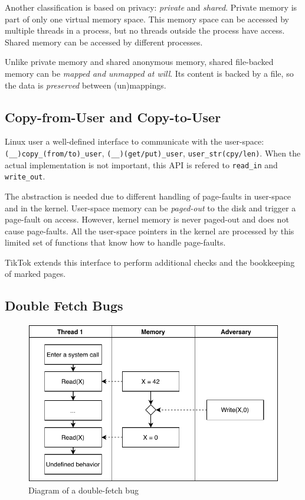 \documentclass[conference]{IEEEtran}
\newcommand{\sysname}{TikTok}
\begin{document}
Another classification is based on privacy: \emph{private} and \emph{shared}. 
Private memory is part of only one virtual memory space. This memory space can 
be accessed by multiple threads in a process, but no threads outside the process
have access. Shared memory can be accessed by different processes.

Unlike private memory and shared anonymous memory, shared file-backed memory can
be \emph{mapped and unmapped at will}. Its content is backed by a file, so the
data is \emph{preserved} between (un)mappings.

\subsection{Copy-from-User and Copy-to-User}
\label{subsec:copy}

Linux user a well-defined interface to communicate with the user-space:
\texttt{(\_\_)copy\_(from/to)\_user}, \texttt{(\_\_)(get/put)\_user},
\texttt{user\_str(cpy/len)}. When the actual implementation is not important,
this API is refered to \texttt{read\_in} and \texttt{write\_out}.

The abstraction is needed due to different handling of page-faults in user-space
and in the kernel. User-space memory can be \emph{paged-out} to the disk and
trigger a page-fault on access. However, kernel memory is never paged-out and
does not cause page-faults. All the user-space pointers in the kernel are
processed by this limited set of functions that know how to handle page-faults.

\sysname{} extends this interface to perform additional checks and the bookkeeping
of marked pages.

\subsection{Double Fetch Bugs}
\label{subsec:doublefetch}

\begin{figure}[]
  \centering
  \includegraphics[width=.85\linewidth]{img/doublefetch.pdf}
  \caption{Diagram of a double-fetch bug}
  \label{fig:doublefetch}
\end{figure}
\end{document}
